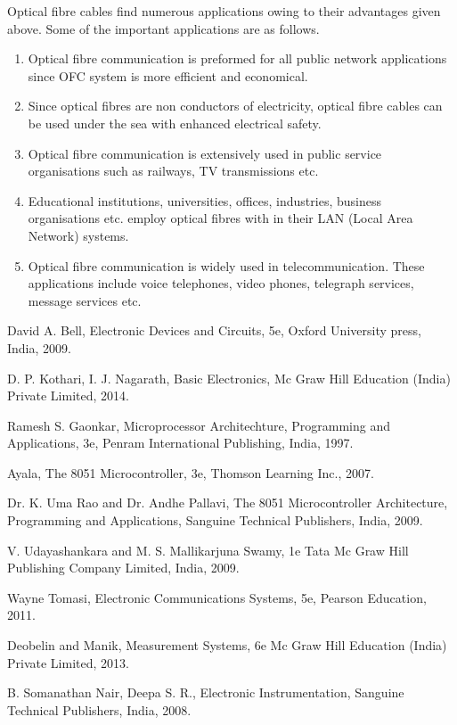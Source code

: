 Optical fibre cables find numerous applications owing to their advantages given above. Some of the important applications are as follows.
\begin{enumerate}
\item Optical fibre communication is preformed for all public network applications since OFC system is more efficient and economical.

\item Since optical fibres are non conductors of electricity, optical fibre cables can be used under the sea with enhanced electrical safety.

\item Optical fibre communication is extensively used in public service organisations such as railways, TV transmissions etc.

\item Educational institutions, universities, offices, industries, business organisations etc. employ optical fibres with in their LAN (Local Area Network) systems.

\item Optical fibre communication is widely used in telecommunication. These applications include voice telephones, video phones, telegraph services, message services etc.
\end{enumerate}


\begin{thebibliography}{99}
 David A. Bell, Electronic Devices and Circuits, 5e, Oxford University press, India, 2009.

 D. P. Kothari, I. J. Nagarath, Basic Electronics, Mc Graw Hill Education (India) Private Limited, 2014.

 Ramesh S. Gaonkar, Microprocessor Architechture, Programming and Applications, 3e, Penram International Publishing, India, 1997.

 Ayala, The 8051 Microcontroller, 3e, Thomson Learning Inc., 2007.

 Dr. K. Uma Rao and Dr. Andhe Pallavi, The 8051 Microcontroller Architecture, Programming and Applications, Sanguine Technical Publishers, India, 2009.

 V. Udayashankara and M. S. Mallikarjuna Swamy, 1e Tata Mc Graw Hill Publishing Company Limited, India, 2009.

 Wayne Tomasi, Electronic Communications Systems, 5e, Pearson Education, 2011.

 Deobelin and Manik, Measurement Systems, 6e Mc Graw Hill Education (India) Private Limited, 2013.

 B. Somanathan Nair, Deepa S. R., Electronic Instrumentation, Sanguine Technical Publishers, India, 2008.
\end{thebibliography}

